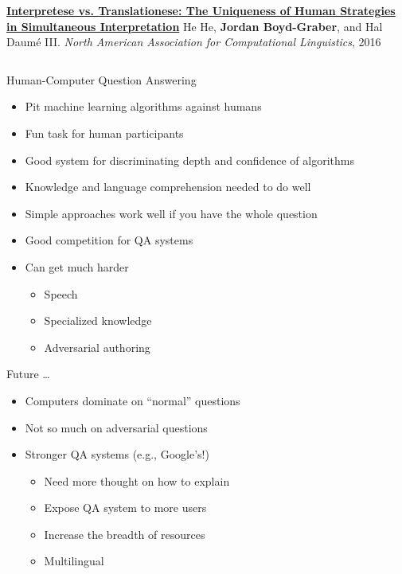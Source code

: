 \documentclass[xcolor=dvipsnames]{beamer}
\begin{document}
\begin{frame}{}
\begin{columns}
        \begin{block}{ {\bf \href{http://umiacs.umd.edu/~jbg/docs/2016_naacl_interpretese.pdf}{Interpretese vs. Translationese: The Uniqueness of Human Strategies in Simultaneous Interpretation}}}
He He, {\bf Jordan Boyd-Graber}, and Hal {Daum\'{e} III}.
\emph{North American Association for Computational Linguistics}, 2016
        \end{block}

  \end{columns}


\end{frame}


\begin{frame}{Human-Computer Question Answering}

  \begin{itemize}
    \item Pit machine learning algorithms against humans
    \item Fun task for human participants
    \item Good system for discriminating depth and confidence of
      algorithms
    \item Knowledge and language comprehension needed to do well
    \item Simple approaches work well if you have the whole question
    \item Good competition for QA systems
    \item Can get much harder
      \begin{itemize}
        \item Speech
       \item Specialized knowledge
        \item Adversarial authoring
      \end{itemize}
  \end{itemize}

\end{frame}


\begin{frame}{Future \dots}

  \begin{itemize}
    \item Computers dominate on ``normal'' questions
    \item Not so much on adversarial questions
    \item Stronger QA systems (e.g., Google's!)
      \begin{itemize}
        \item Need more thought on how to explain
        \item Expose QA system to more users
        \item Increase the breadth of resources
        \item Multilingual
      \end{itemize}
  \end{itemize}

\end{frame}
\end{document}
